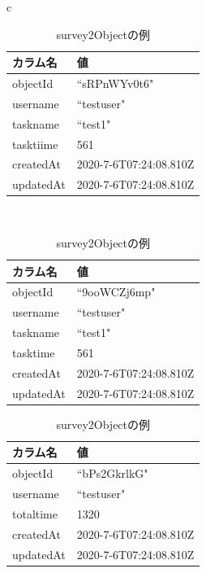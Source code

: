 \begin{table}[htb]
\begin{center}
\begin{tabular}{c}

\begin{minipage}[htb]{\linewidth}
\begin{center}
   \caption{tasktimeObjectの例}
  \begin{tabular}{|l|l|} \hline
    カラム名 & 値 \\ \hline
    objectId & ``sRPnWYv0t6" \\
    username & ``testuser" \\
    taskname & ``test1" \\
    tasktiime & 561 \\ 
    createdAt & 2020-7-6T07:24:08.810Z  \\
    updatedAt & 2020-7-6T07:24:08.810Z \\ \hline
  \end{tabular}
  \label{tb:tasktime_object}
\end{center}
\end{minipage}

\\

\begin{minipage}[htb]{0.5\linewidth}
\begin{center}
  \caption{surveyObjectの例}
  \begin{tabular}{|l|l|} \hline
    カラム名 & 値 \\ \hline
    objectId & ``9ooWCZj6mp" \\
    username & ``testuser" \\
    taskname & ``test1" \\
    tasktime & 561 \\ 
    createdAt & 2020-7-6T07:24:08.810Z  \\
    updatedAt & 2020-7-6T07:24:08.810Z \\ \hline
  \end{tabular}
  \label{tb:survey_object}
\end{center}
\end{minipage}

\begin{minipage}[htb]{0.5\linewidth}
\begin{center}
  \caption{survey2Objectの例}
  \begin{tabular}{|l|l|} \hline
    カラム名 & 値 \\ \hline
    objectId & ``bPs2GkrlkG" \\
    username & ``testuser" \\
    totaltime & 1320 \\ 
    createdAt & 2020-7-6T07:24:08.810Z  \\
    updatedAt & 2020-7-6T07:24:08.810Z \\ \hline
  \end{tabular}
  \label{tb:survey2_object}
\end{center}
\end{minipage}
\end{tabular}
\end{center}
\end{table}